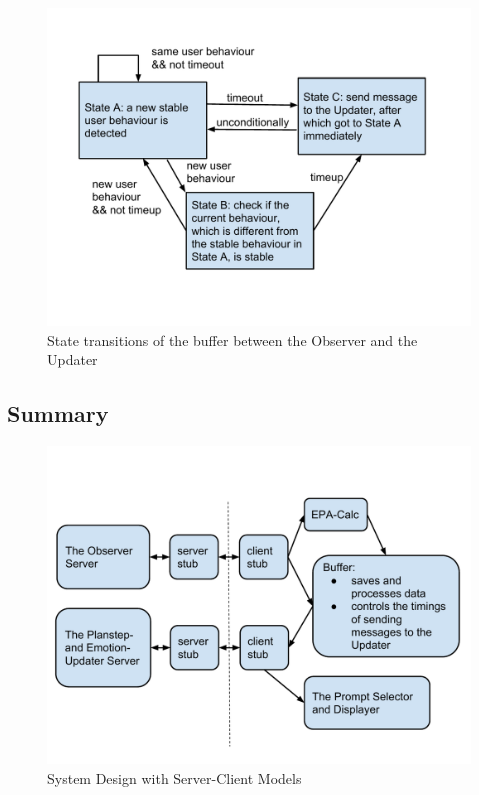 \begin{figure}[h!]
\centering
\includegraphics[width=0.9\linewidth]{fig-state-trans.pdf}
\caption{State transitions of the buffer between the Observer and the Updater}
\label{fig:state-trans}
\end{figure}

\subsection{Summary}

\begin{figure}[h!]
\centering
\includegraphics[width=0.9\linewidth]{fig-system.pdf}
\caption{System Design with Server-Client Models}
\label{fig:system}
\end{figure}

